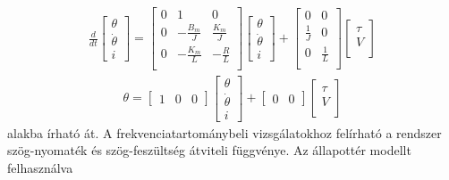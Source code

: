 \begin{align}\label{eq:state_space}
    \frac{d}{dt}
    \begin{bmatrix}
        \theta \\
        \dot\theta \\
        i
    \end{bmatrix}
    =
    \begin{bmatrix}
        0 & 1 & 0 \\
        0 & -\frac{B_m}{J} & \frac{K_m}{J} \\
        0 & -\frac{K_m}{L} & -\frac{R}{L} \\
    \end{bmatrix}
    \begin{bmatrix}
        \theta \\
        \dot\theta \\
        i
    \end{bmatrix}
    +
    \begin{bmatrix}
        0 & 0 \\
        \frac{1}{J} & 0 \\
        0 & \frac{1}{L} \\
    \end{bmatrix}
    \begin{bmatrix}
        \tau \\
        V \\
    \end{bmatrix}
\end{align}
\begin{align}\label{eq:state_space_out}
    \theta = 
    \begin{bmatrix}
        1 & 0 & 0
    \end{bmatrix}
    \begin{bmatrix}
        \theta \\
        \dot\theta \\
        i
    \end{bmatrix}
    +
    \begin{bmatrix}
        0 & 0
    \end{bmatrix}
    \begin{bmatrix}
        \tau \\
        V \\
    \end{bmatrix}
\end{align}
alakba írható át. A frekvenciatartománybeli vizsgálatokhoz felírható a rendszer 
szög-nyomaték és szög-feszültség átviteli függvénye. Az állapottér modellt felhasználva
